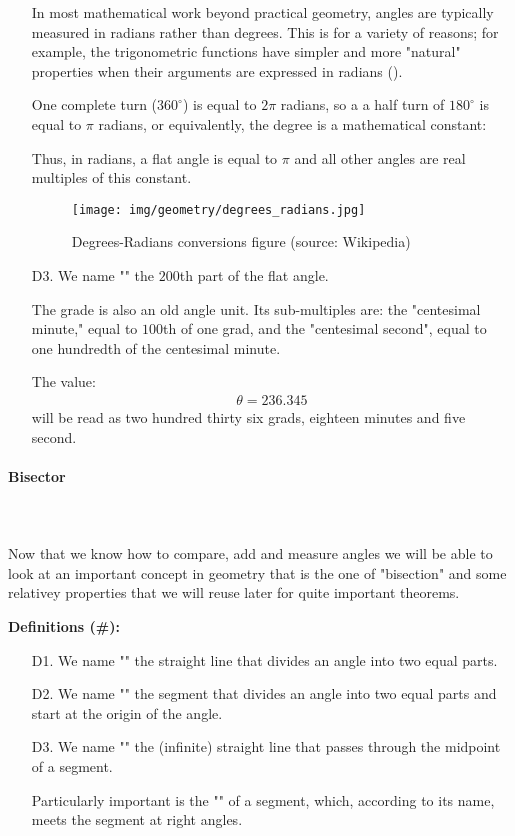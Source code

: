\begin{enumerate}
		In most mathematical work beyond practical geometry, angles are typically measured in radians rather than degrees. This is for a variety of reasons; for example, the trigonometric functions have simpler and more "natural" properties when their arguments are expressed in radians (). 
		
		One complete turn ($360^\circ $) is equal to $2\pi$ radians, so a a half turn of $180^\circ$ is equal to $\pi$ radians, or equivalently, the degree is a mathematical constant:
		
		Thus, in radians, a flat angle is equal to $\pi$ and all other angles are real multiples of this constant.
		\begin{figure}[H]
			\centering
			\texttt{[image: img/geometry/degrees\_radians.jpg]}
			\caption{Degrees-Radians conversions figure (source: Wikipedia)}
		\end{figure}

		\item[D3.] We name "" the $200$th part of the flat angle.
		
		The grade is also an old angle unit. Its sub-multiples are: the "centesimal minute," equal to $100$th of one grad, and the "centesimal second", equal to one hundredth of the centesimal minute.
		
		The value:
		\begin{gather*}
			\theta=236.345
		\end{gather*}
		 will be read as two hundred thirty six grads, eighteen  minutes and five second.
	\end{enumerate}
	
	\pagebreak
	\paragraph{Bisector}\mbox{}\\\\
	Now that we know how to compare, add and measure angles we will be able to look at an important concept in geometry that is the one of "bisection" and some relativey properties that we will reuse later for quite important theorems.

	\textbf{Definitions (\#\mydef):}
	\begin{enumerate}
		\item[D1.] We name "" the straight line that divides an angle into two equal parts.

		\item[D2.] We name ""  the segment that divides an angle into two equal parts and start at the origin of the angle.

		\item[D3.] We name "" the (infinite) straight line that passes through the midpoint of a segment.

		Particularly important is the "" of a segment, which, according to its name, meets the segment at right angles. 
	\end{enumerate}
	
